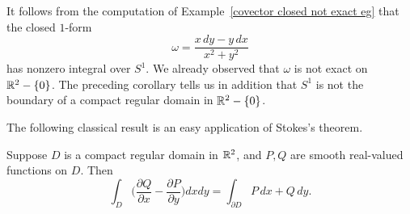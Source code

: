 \begin{example}
It follows from the computation of Example~\ref{covector closed not exact eg} that the closed $1$-form 
\[\omega=\frac{x\,dy-y\,dx}{x^2+y^2}\]
has nonzero integral over $S^1$. We already observed that $\omega$ is not exact on $\mathbb{R}^2-\{0\}$. The preceding corollary tells us in addition that $S^1$ is not the boundary of a compact regular domain in $\mathbb{R}^2-\{0\}$.
\end{example}
The following classical result is an easy application of Stokes's theorem.
\begin{theorem}
Suppose $D$ is a compact regular domain in $\mathbb{R}^2$, and $P,Q$ are smooth real-valued functions on $D$. Then
\[\int_D\Big(\frac{\partial Q}{\partial x}-\frac{\partial P}{\partial y}\Big)dxdy=\int_{\partial D}P\,dx+Q\,dy.\]
\end{theorem}
